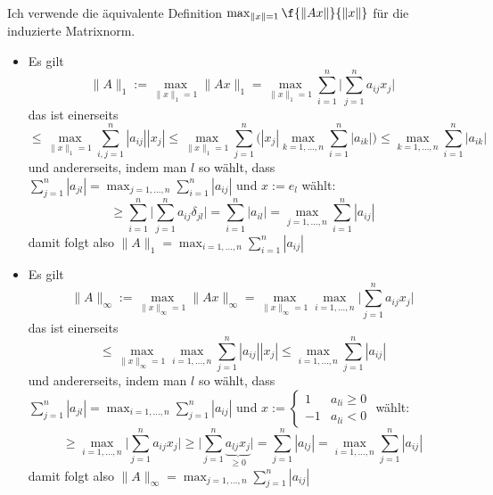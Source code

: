 \documentclass[a4paper]{scrartcl}
\begin{document}
\setcounter{aufgabe}{2}
\begin{aufgabe}~

	Ich verwende die äquivalente Definition $\max_{\|x\|=1}\f {\|Ax\|}{\|x\|}$ für die induzierte Matrixnorm.
	\begin{itemize}
		\item
			Es gilt
			\[
				\|A\|_1 := \max_{\|x\|_1=1} \|Ax\|_1 = \max_{\|x\|_1=1}\sum_{i=1}^n \Big| \sum_{j=1}^n a_{ij} x_j \Big|
			\]
			das ist einerseits
			\[
				\le \max_{\|x\|_1=1} \sum_{i,j=1}^n |a_{ij}| |x_j| \le \max_{\|x\|_1=1} \sum_{j=1}^n \bigg( |x_j| \max_{k=1,\dotsc,n} \sum_{i=1}^n |a_{ik}| \bigg) \le \max_{k=1,\dotsc,n} \sum_{i=1}^n |a_{ik}|
			\]
			und andererseits, indem man $l$ so wählt, dass $\displaystyle \sum_{j=1}^n |a_{jl}| = \max_{j=1,\dotsc,n} \sum_{i=1}^n |a_{ij}|$ und $x := e_l$ wählt:
			\[
				\ge \sum_{i=1}^n \Big| \sum_{j=1}^n a_{ij} \delta_{jl} \Big| = \sum_{i=1}^n |a_{il} | = \max_{j=1,\dotsc,n} \sum_{i=1}^n |a_{ij}|
			\]
			damit folgt also $\displaystyle \|A\|_1 = \max_{i=1,\dotsc,n} \sum_{i=1}^n |a_{ij}|$
		\item
			Es gilt
			\[
				\|A\|_\infty := \max_{\|x\|_\infty=1} \|Ax\|_\infty = \max_{\|x\|_\infty=1}\max_{i=1,\dotsc,n} \Big| \sum_{j=1}^n a_{ij} x_j \Big|
			\]
			das ist einerseits
			\[
				\le \max_{\|x\|_\infty=1} \max_{i=1,\dotsc,n} \sum_{j=1}^n |a_{ij}||x_j|
				\le \max_{i=1,\dotsc,n} \sum_{j=1}^n |a_{ij}|
			\]
			und andererseits, indem man $l$ so wählt, dass $\displaystyle \sum_{j=1}^n |a_{jl}| = \max_{i=1,\dotsc,n} \sum_{j=1}^n |a_{ij}|$ und $x := \begin{cases}1 & a_{li} \ge 0 \\ -1 & a_{li} < 0 \end{cases}$ wählt:
			\[
				\ge \max_{i=1,\dotsc,n} \Big| \sum_{j=1}^n a_{ij} x_j \Big|
				\ge \Big| \sum_{j=1}^n \underbrace{a_{lj} x_j}_{\ge 0} \Big| = \sum_{j=1}^n |a_{lj}| = \max_{i=1,\dotsc,n} \sum_{j=1}^n |a_{ij}|
			\]
			damit folgt also $\displaystyle \|A\|_\infty = \max_{j=1,\dotsc,n} \sum_{j=1}^n |a_{ij}|$

	\end{itemize}
\end{aufgabe}
\end{document}
